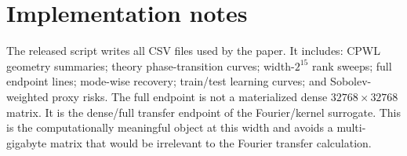 \documentclass[10pt]{article}
\begin{document}
\section{Implementation notes}
The released script writes all CSV files used by the paper.  It includes: CPWL geometry summaries; theory phase-transition curves; width-$2^{15}$ rank sweeps; full endpoint lines; mode-wise recovery; train/test learning curves; and Sobolev-weighted proxy risks.  The full endpoint is not a materialized dense $32768\times32768$ matrix.  It is the dense/full transfer endpoint of the Fourier/kernel surrogate.  This is the computationally meaningful object at this width and avoids a multi-gigabyte matrix that would be irrelevant to the Fourier transfer calculation.
\end{document}
